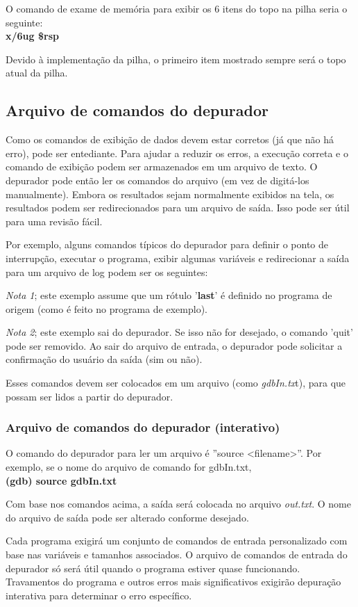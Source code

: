 O comando de exame de memória para exibir os 6 itens do topo na pilha seria o seguinte:\\
\textbf{x/6ug \$rsp}

Devido à implementação da pilha, o primeiro item mostrado sempre será o topo atual da pilha.

\subsection{Arquivo de comandos do depurador}
Como os comandos de exibição de dados devem estar corretos (já que não há erro), pode ser entediante. Para ajudar a reduzir os erros, a execução correta e o comando de exibição podem ser armazenados em um arquivo de texto. O depurador pode então ler os comandos do arquivo (em vez de digitá-los manualmente). Embora os resultados sejam normalmente exibidos na tela, os resultados podem ser redirecionados para um arquivo de saída. Isso pode ser útil para uma revisão fácil.

Por exemplo, alguns comandos típicos do depurador para definir o ponto de interrupção, executar o programa, exibir algumas variáveis e redirecionar a saída para um arquivo de log podem ser os seguintes:


\textit{Nota 1}; este exemplo assume que um rótulo '\textbf{last}' é definido no programa de origem (como é feito no programa de exemplo).

\textit{Nota 2}; este exemplo sai do depurador. Se isso não for desejado, o comando 'quit' pode ser removido. Ao sair do arquivo de entrada, o depurador pode solicitar a confirmação do usuário da saída (sim ou não).

Esses comandos devem ser colocados em um arquivo (como \textit{gdbIn.tx}t), para que possam ser lidos a partir do depurador.

\subsubsection{Arquivo de comandos do depurador (interativo)}
O comando do depurador para ler um arquivo é ''source <filename>''. Por exemplo, se o nome do arquivo de comando for gdbIn.txt,\\
	\textbf{(gdb) source gdbIn.txt}

Com base nos comandos acima, a saída será colocada no arquivo \textit{out.txt}. O nome do arquivo de saída pode ser alterado conforme desejado.

Cada programa exigirá um conjunto de comandos de entrada personalizado com base nas variáveis e tamanhos associados. O arquivo de comandos de entrada do depurador só será útil quando o programa estiver quase funcionando. Travamentos do programa e outros erros mais significativos exigirão depuração interativa para determinar o erro específico.


